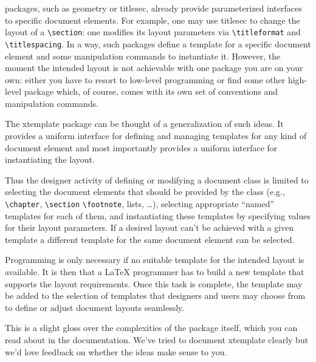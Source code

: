 \documentclass{ltnews}
\begin{document}
\LaTeXe{} packages, such as \textsf{geometry} or \textsf{titlesec}, already provide
parameterized interfaces to specific document elements.  For example,
one may use \textsf{titlesec} to change the
layout of a \verb|\section|: one modifies its layout parameters via \verb|\titleformat| and \verb|\titlespacing|.
In a way, such packages define a template for a specific document element and
some manipulation commands to instantiate it.
\pagebreak
However, the moment the intended
layout is not achievable with one package you are on your own: either you have
to resort to low-level programming or find some other high-level package which, of course, comes with its own set of conventions and manipulation commands.

The \textsf{xtemplate} package can be thought of a generalization of such
ideas. It provides a uniform interface for defining and managing templates for
any kind of document element and most importantly provides a uniform interface
for instantiating the layout.

Thus the designer activity of defining or modifying a document class is
limited to selecting the document elements that should be provided by the
class (e.g., \verb|\chapter|, \verb|\section| \verb|\footnote|, lists, \ldots), selecting
appropriate ``named'' templates for each of them, and instantiating these
templates by specifying values for their layout parameters. If a desired
layout can't be achieved with a given template a different template for the
same document element can be selected.

Programming is only necessary
if no suitable template for the intended layout is available.
It is then that a \LaTeX{} programmer has to build a new template
that supports the layout requirements. Once this task is complete, the
template may be
added to the selection of templates that designers and users may choose from
to define or adjust document layouts seamlessly.

This is a slight gloss over the complexities of the package itself, which you can read about in the documentation. We've tried to document \textsf{xtemplate} clearly but we'd love feedback on whether the ideas make sense to you.
\end{document}
